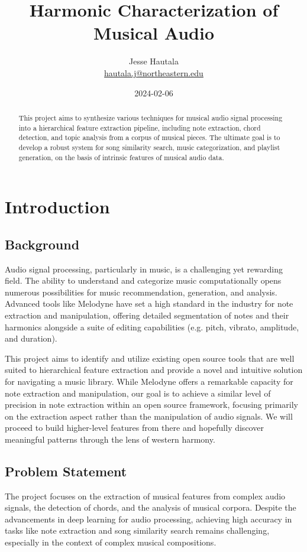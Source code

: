 \documentclass[12pt,english]{article}
\title{Harmonic Characterization of Musical Audio}
\author{Jesse Hautala\\ \href{mailto:hautala.j@northeastern.edu}{hautala.j@northeastern.edu}}
\date{2024-02-06}
\begin{document}
\maketitle

\begin{abstract}
This project aims to synthesize various techniques for musical audio signal processing into a hierarchical feature extraction pipeline, including note extraction, chord detection, and topic analysis from a corpus of musical pieces. The ultimate goal is to develop a robust system for song similarity search, music categorization, and playlist generation, on the basis of intrinsic features of musical audio data.
\end{abstract}

\section{Introduction}
\subsection{Background}
Audio signal processing, particularly in music, is a challenging yet rewarding field. The ability to understand and categorize music computationally opens numerous possibilities for music recommendation, generation, and analysis. Advanced tools like Melodyne have set a high standard in the industry for note extraction and manipulation, offering detailed segmentation of notes and their harmonics alongside a suite of editing capabilities (e.g. pitch, vibrato, amplitude, and duration).
\newline

\noindent
This project aims to identify and utilize existing open source tools that are well suited to hierarchical feature extraction and provide a novel and intuitive solution for navigating a music library. While Melodyne offers a remarkable capacity for note extraction and manipulation, our goal is to achieve a similar level of precision in note extraction within an open source framework, focusing primarily on the extraction aspect rather than the manipulation of audio signals. We will proceed to build higher-level features from there and hopefully discover meaningful patterns through the lens of western harmony.

\subsection{Problem Statement}
The project focuses on the extraction of musical features from complex audio signals, the detection of chords, and the analysis of musical corpora. Despite the advancements in deep learning for audio processing, achieving high accuracy in tasks like note extraction and song similarity search remains challenging, especially in the context of complex musical compositions.
\newline
\end{document}
